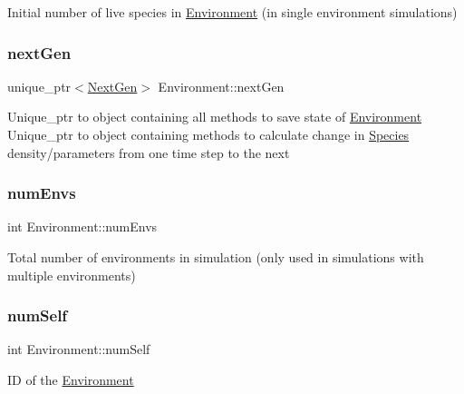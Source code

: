 Initial number of live species in \hyperlink{classEnvironment}{Environment} (in single environment simulations) \hypertarget{classEnvironment_ad696c5a7be91ffc89586abb10281e181}{}\label{classEnvironment_ad696c5a7be91ffc89586abb10281e181} 
\subsubsection{\texorpdfstring{next\+Gen}{nextGen}}
{\footnotesize\ttfamily unique\+\_\+ptr$<$\hyperlink{classNextGen}{Next\+Gen}$>$ Environment\+::next\+Gen\hspace{0.3cm}{\ttfamily [protected]}}

Unique\+\_\+ptr to object containing all methods to save state of \hyperlink{classEnvironment}{Environment} Unique\+\_\+ptr to object containing methods to calculate change in \hyperlink{classSpecies}{Species} density/parameters from one time step to the next \hypertarget{classEnvironment_ab9b14bfdd2e25805a6e67463e948da4a}{}\label{classEnvironment_ab9b14bfdd2e25805a6e67463e948da4a} 
\subsubsection{\texorpdfstring{num\+Envs}{numEnvs}}
{\footnotesize\ttfamily int Environment\+::num\+Envs\hspace{0.3cm}{\ttfamily [protected]}}

Total number of environments in simulation (only used in simulations with multiple environments) \hypertarget{classEnvironment_a2563f570023ff1e17f87549bcf2fab59}{}\label{classEnvironment_a2563f570023ff1e17f87549bcf2fab59} 
\subsubsection{\texorpdfstring{num\+Self}{numSelf}}
{\footnotesize\ttfamily int Environment\+::num\+Self\hspace{0.3cm}{\ttfamily [protected]}}

ID of the \hyperlink{classEnvironment}{Environment} \hypertarget{classEnvironment_a27a1684288d74f2cabb8cfbd0848b14e}{}\label{classEnvironment_a27a1684288d74f2cabb8cfbd0848b14e} 
